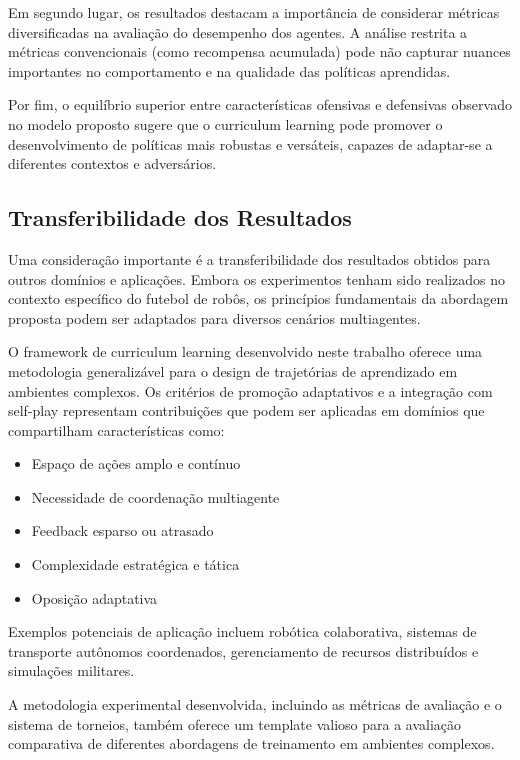 Em segundo lugar, os resultados destacam a importância de considerar métricas diversificadas na avaliação do desempenho dos agentes. A análise restrita a métricas convencionais (como recompensa acumulada) pode não capturar nuances importantes no comportamento e na qualidade das políticas aprendidas.

Por fim, o equilíbrio superior entre características ofensivas e defensivas observado no modelo proposto sugere que o curriculum learning pode promover o desenvolvimento de políticas mais robustas e versáteis, capazes de adaptar-se a diferentes contextos e adversários.

\subsection{Transferibilidade dos Resultados}

Uma consideração importante é a transferibilidade dos resultados obtidos para outros domínios e aplicações. Embora os experimentos tenham sido realizados no contexto específico do futebol de robôs, os princípios fundamentais da abordagem proposta podem ser adaptados para diversos cenários multiagentes.

O framework de curriculum learning desenvolvido neste trabalho oferece uma metodologia generalizável para o design de trajetórias de aprendizado em ambientes complexos. Os critérios de promoção adaptativos e a integração com self-play representam contribuições que podem ser aplicadas em domínios que compartilham características como:

\begin{itemize}
    \item Espaço de ações amplo e contínuo
    \item Necessidade de coordenação multiagente
    \item Feedback esparso ou atrasado
    \item Complexidade estratégica e tática
    \item Oposição adaptativa
\end{itemize}

Exemplos potenciais de aplicação incluem robótica colaborativa, sistemas de transporte autônomos coordenados, gerenciamento de recursos distribuídos e simulações militares.

A metodologia experimental desenvolvida, incluindo as métricas de avaliação e o sistema de torneios, também oferece um template valioso para a avaliação comparativa de diferentes abordagens de treinamento em ambientes complexos. 